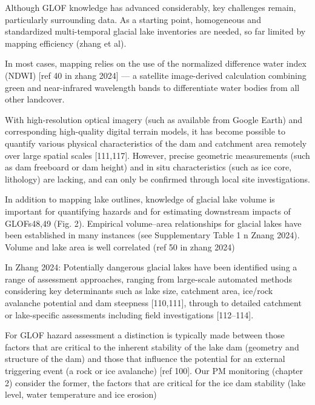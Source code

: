 Although GLOF knowledge has advanced considerably, key challenges remain, particularly surrounding data. As a starting point, homogeneous and standardized multi-temporal glacial lake inventories are needed, so far limited by mapping efficiency (zhang et al).


In most cases, mapping relies on the use of the normalized difference water index (NDWI) [ref 40 in zhang 2024] — a satellite image-derived calculation combining green and near-infrared wavelength bands to differentiate water bodies from all other landcover.

With high-resolution optical imagery (such as available from Google Earth) and corresponding high-quality digital terrain models, it has become possible to quantify various physical characteristics of the dam and catchment area remotely over large spatial scales [111,117]. However, precise geometric measurements (such as dam freeboard or dam height) and in situ characteristics (such as ice core, lithology) are lacking, and can only be confirmed through local site investigations.

In addition to mapping lake outlines, knowledge of glacial lake volume is important for quantifying hazards and for estimating downstream impacts of GLOFs48,49 (Fig. 2). Empirical volume–area relationships for glacial lakes have been established in many instances (see Supplementary Table 1 n Znang 2024). 
Volume and lake area is well correlated (ref 50 in zhang 2024)


In Zhang 2024: Potentially dangerous glacial lakes have been identified using a range of assessment approaches, ranging from large-scale automated methods considering key determinants such as lake size, catchment area, ice/rock avalanche potential and dam steepness [110,111], through to detailed catchment or lake-specific assessments including field investigations [112–114]. 

For GLOF hazard assessment a distinction is typically made between those factors that are critical to the inherent stability of the lake dam (geometry and structure of the dam) and those that influence the potential for an external triggering event (a rock or ice avalanche) [ref 100]. Our PM monitoring (chapter 2) consider the former, the factors that are critical for the ice dam stability (lake level, water temperature and ice erosion)

